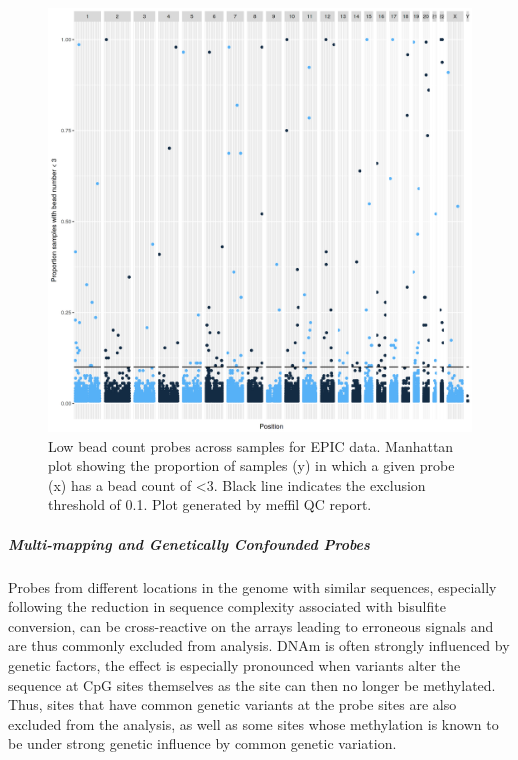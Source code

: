 \documentclass[
]{book}
\begin{document}
\begin{figure}

{\centering \includegraphics[width=0.8\linewidth]{figs/MAVIDOSqcEPICbeadNumAcross} 

}

\caption{Low bead count probes across samples for EPIC data. Manhattan plot showing the proportion of samples (y) in which a given probe (x) has a bead count of \textless3. Black line indicates the exclusion threshold of 0.1. Plot generated by meffil QC report.}\label{fig:MAVIDOSqcEPICbeadNumAcross}
\end{figure}



\hypertarget{multi-mapping-and-genetically-confounded-probes}{%
\subparagraph{Multi-mapping and Genetically Confounded Probes}\label{multi-mapping-and-genetically-confounded-probes}}

Probes from different locations in the genome with similar sequences, especially following the reduction in sequence complexity associated with bisulfite conversion, can be cross-reactive on the arrays leading to erroneous signals and are thus commonly excluded from analysis.
DNAm is often strongly influenced by genetic factors, the effect is especially pronounced when variants alter the sequence at CpG sites themselves as the site can then no longer be methylated.
Thus, sites that have common genetic variants at the probe sites are also excluded from the analysis, as well as some sites whose methylation is known to be under strong genetic influence by common genetic variation.
\end{document}
